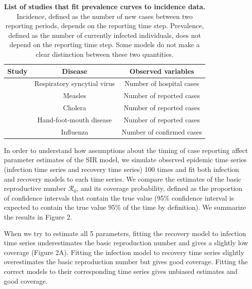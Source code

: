 \documentclass[12pt]{article}\usepackage[]{graphicx}\usepackage[]{color}
\begin{document}
\begin{table}
\centering
\begin{tabular}{l | c | c}
\hline
\textbf{Study} & \textbf{Disease} &  \textbf{Observed variables}\\
\hline
\cite{capistran2009parameter} & Respiratory syncytial virus & Number of hospital cases\\
\cite{hooker2010parameterizing} & Measles & Number of reported cases\\
\cite{eisenberg2013identifiability} & Cholera & Number of reported cases\\
\cite{yang2013stability} & Hand-foot-mouth disease & Number of reported cases\\
\cite{gonzalez2014fractional} & Influenza & Number of confirmed cases\\
\hline
\end{tabular}
\caption{
\textbf{List of studies that fit prevalence curves to incidence data.}
Incidence, defined as the number of new cases between two reporting periods, depends
on the reporting time step.
Prevalence, defined as the number of currently infected individuals, does not depend
on the reporting time step.
Some models do not make a clear distinction between these two quantities.
}
\end{table}

In order to understand how assumptions about the timing of case reporting affect 
parameter estimates of the SIR model, we simulate observed epidemic time series
(infection time series and recovery time series) 
100 times and fit both infection and recovery models to each 
time series. We compare the estimates of the basic reproductive number $\mathcal R_0$,
and its coverage probability, defined as the proportion of confidence intervals that
contain the true value (95\% confidence interval is expected to contain the true value
95\% of the time by definition). We summarize the results in Figure 2.

When we try to estimate all 5 parameters, fitting the recovery model to
infection time series underestimates the basic reproduction number and 
gives a slightly low coverage (Figure 2A). Fitting the infection model to recovery
time series slightly overestimates the basic reproduction number but gives 
good coverage. Fitting the correct models to their corresponding time series
gives unbiased estimates and good coverage.
\end{document}
